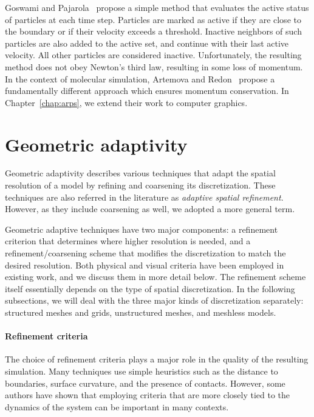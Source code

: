 Goswami and Pajarola~\cite{Goswami2011} propose a simple method that evaluates the active status of particles at each time step.
Particles are marked as active if they are close to the boundary or if their velocity exceeds a threshold.
Inactive neighbors of such particles are also added to the active set, and continue with their last active velocity.
All other particles are considered inactive.
Unfortunately, the resulting method does not obey Newton's third law, resulting in some loss of momentum.
In the context of molecular simulation, Artemova and Redon~\cite{Artemova2012} propose a fundamentally different approach which ensures momentum conservation. In Chapter~\ref{chap:arps}, we extend their work to computer graphics.

\section{Geometric adaptivity} 
\label{sec:spatial_refinement}

Geometric adaptivity describes various techniques that adapt the spatial resolution of a model by refining and coarsening its discretization. These techniques are also referred in the literature as \emph{adaptive spatial refinement}. However, as they include coarsening as well, we adopted a more general term.

Geometric adaptive techniques have two major components: a refinement criterion that determines where higher resolution is needed, and a refinement/coarsening scheme that modifies the discretization to match the desired resolution.
Both physical and visual criteria have been employed in existing work, and we discuss them in more detail below.
The refinement scheme itself essentially depends on the type of spatial discretization.
In the following subsections, we will deal with the three major kinds of discretization separately: structured meshes and grids, unstructured meshes, and meshless models.


\paragraph*{Refinement criteria}
The choice of refinement criteria plays a major role in the quality of the resulting simulation.
Many techniques use simple heuristics such as the distance to boundaries, surface curvature, and the presence of contacts.
However, some authors have shown that employing criteria that are more closely tied to the dynamics of the system can be important in many contexts.

